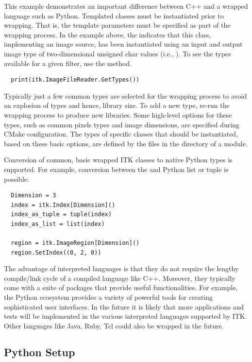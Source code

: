 This example demonstrates an important difference between C++ and a wrapped
language such as Python. Templated classes must be instantiated prior to
wrapping. That is, the template parameters must be specified as part of the
wrapping process. In the example above, the
 indicates that this class, implementing
an image source, has been
instantiated using an input and output image type of two-dimensional unsigned
char values (i.e., ). To see the types available for a given filter,
use the  method.

\small
\begin{verbatim}
  print(itk.ImageFileReader.GetTypes())
\end{verbatim}
\normalsize

Typically just a few common types are selected for the wrapping process to
avoid an explosion of types and hence, library size. To add a new type, re-run
the wrapping process to produce new libraries. Some high-level options for
these types, such as common pixels types and image dimensions, are specified
during CMake configuration.  The types of specific classes that should be
instantiated, based on these basic options, are defined by the 
files in the  directory of a module.

Conversion of common, basic wrapped ITK classes to native Python types is
supported. For example, conversion between the  and Python list
or tuple is possible:

\small
\begin{verbatim}
  Dimension = 3
  index = itk.Index[Dimension]()
  index_as_tuple = tuple(index)
  index_as_list = list(index)

  region = itk.ImageRegion[Dimension]()
  region.SetIndex((0, 2, 0))
\end{verbatim}
\normalsize

The advantage of interpreted languages is that they do not require the lengthy
compile/link cycle of a compiled language like C++. Moreover, they typically
come with a suite of packages that provide useful functionalities. For example,
the Python ecosystem provides a variety of powerful tools for creating
sophisticated user interfaces. In the future it is likely that more
applications and tests will be implemented in the various interpreted
languages supported by ITK. Other languages like Java, Ruby, Tcl could also be
wrapped in the future.

\subsection{Python Setup}

